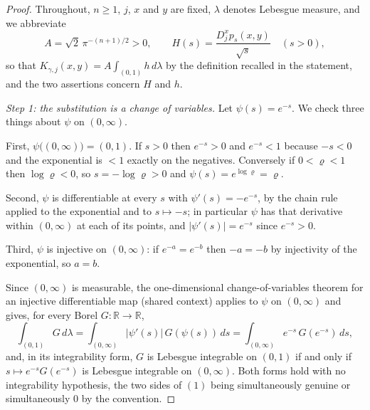 \begin{proof}
Throughout, $n \geq 1$, $j$, $x$ and $y$ are fixed, $\lambda$ denotes Lebesgue
measure, and we abbreviate
\[
  A = \sqrt2\,\pi^{-(n+1)/2} > 0 ,
  \qquad
  H(s) = \frac{D_j^xp_s(x,y)}{\sqrt s} \quad (s>0) ,
\]
so that $K_{\gamma,j}(x,y) = A\int_{(0,1)}h\,d\lambda$ by the definition recalled
in the statement, and the two assertions concern $H$ and $h$.

\emph{Step 1: the substitution is a change of variables.}
Let $\psi(s) = e^{-s}$.  We check three things about $\psi$ on $(0,\infty)$.

First, $\psi\bigl((0,\infty)\bigr) = (0,1)$.  If $s > 0$ then $e^{-s} > 0$ and
$e^{-s} < 1$ because $-s < 0$ and the exponential is $<1$ exactly on the
negatives.  Conversely if $0 < \varrho < 1$ then $\log\varrho < 0$, so
$s = -\log\varrho > 0$ and $\psi(s) = e^{\log\varrho} = \varrho$.

Second, $\psi$ is differentiable at every $s$ with $\psi'(s) = -e^{-s}$, by the
chain rule applied to the exponential and to $s \mapsto -s$; in particular
$\psi$ has that derivative within $(0,\infty)$ at each of its points, and
$|\psi'(s)| = e^{-s}$ since $e^{-s} > 0$.

Third, $\psi$ is injective on $(0,\infty)$: if $e^{-a} = e^{-b}$ then $-a = -b$
by injectivity of the exponential, so $a = b$.

Since $(0,\infty)$ is measurable, the one-dimensional change-of-variables
theorem for an injective differentiable map (shared context) applies to $\psi$
on $(0,\infty)$ and gives, for every Borel $G : \mathbb{R} \to \mathbb{R}$,
\begin{equation*}
  \int_{(0,1)} G\,d\lambda
    = \int_{(0,\infty)} |\psi'(s)|\,G(\psi(s))\,ds
    = \int_{(0,\infty)} e^{-s}\,G(e^{-s})\,ds , \tag{1}
\end{equation*}
and, in its integrability form, $G$ is Lebesgue integrable on $(0,1)$ if and
only if $s \mapsto e^{-s}G(e^{-s})$ is Lebesgue integrable on $(0,\infty)$.
Both forms hold with no integrability hypothesis, the two sides of $(1)$ being
simultaneously genuine or simultaneously $0$ by the convention.


\end{proof}
